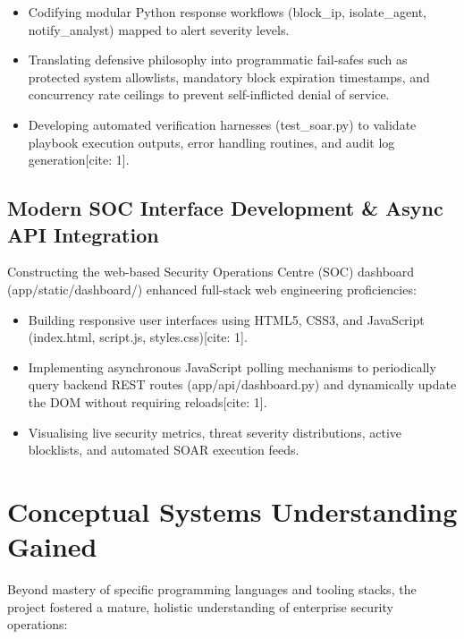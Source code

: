 \begin{itemize}
  \item Codifying modular Python response workflows (block\_ip, isolate\_agent, notify\_analyst) mapped to alert severity levels.
  \item Translating defensive philosophy into programmatic fail-safes such as protected system allowlists, mandatory block expiration timestamps, and concurrency rate ceilings to prevent self-inflicted denial of service.
  \item Developing automated verification harnesses (test\_soar.py) to validate playbook execution outputs, error handling routines, and audit log generation[cite: 1].
\end{itemize}

\subsection{Modern SOC Interface Development \& Async API Integration}

Constructing the web-based Security Operations Centre (SOC) dashboard (app/static/dashboard/) enhanced full-stack web engineering proficiencies:

\begin{itemize}
  \item Building responsive user interfaces using HTML5, CSS3, and JavaScript (index.html, script.js, styles.css)[cite: 1].
  \item Implementing asynchronous JavaScript polling mechanisms to periodically query backend REST routes (app/api/dashboard.py) and dynamically update the DOM without requiring reloads[cite: 1].
  \item Visualising live security metrics, threat severity distributions, active blocklists, and automated SOAR execution feeds.
\end{itemize}

\section{Conceptual Systems Understanding Gained}

Beyond mastery of specific programming languages and tooling stacks, the project fostered a mature, holistic understanding of enterprise security operations:


